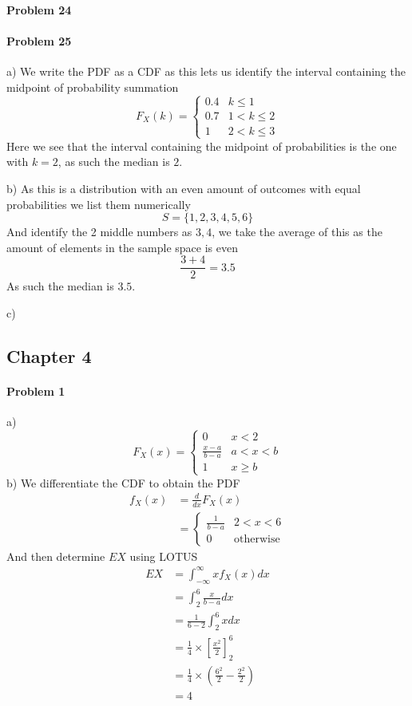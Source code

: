 \paragraph{Problem 24}
\paragraph{Problem 25}
a)
We write the PDF as a CDF as this lets us identify the interval containing the midpoint of probability summation
\[
    F_{X}(k)=\begin{cases}0.4 & k\leq 1 \\ 0.7 & 1<k\leq 2 \\ 1 & 2<k\leq 3\end{cases}
\]
Here we see that the interval containing the midpoint of probabilities is the one with $k=2$, as such the median is $2$.

b)
As this is a distribution with an even amount of outcomes with equal probabilities we list them numerically
\[
    S=\{1,2,3,4,5,6\}
\]
And identify the 2 middle numbers as $3,4$, we take the average of this as the amount of elements in the sample space is even
\[
    \frac{3+4}{2}=3.5
\]
As such the median is $3.5$.

c)

\pagebreak
\subsection{Chapter 4}
\paragraph{Problem 1}
a)
\[
    F_{X}(x)=\begin{cases}0 & x<2 \\ \frac{x-a}{b-a} & a<x<b \\ 1 & x\geq b\end{cases}
\]
b)
We differentiate the CDF to obtain the PDF 
\begin{align*}
    f_{X}(x)&=\frac{d}{dx}F_{X}(x) \\
            &=\begin{cases}\frac{1}{b-a} & 2<x<6 \\ 0 & \text{otherwise}\end{cases}
\end{align*}
And then determine $EX$ using LOTUS
\begin{align*}
    EX&=\int_{-\infty}^{\infty}xf_{X}(x)dx \\
      &=\int_{2}^{6}\frac{x}{b-a}dx \\
      &=\frac{1}{6-2}\int_{2}^{6}xdx \\
      &=\frac{1}{4}\times\left[\frac{x^{2}}{2}\right]_{2}^{6} \\
      &=\frac{1}{4}\times\left(\frac{6^{2}}{2}-\frac{2^{2}}{2}\right) \\
      &=4
\end{align*}
